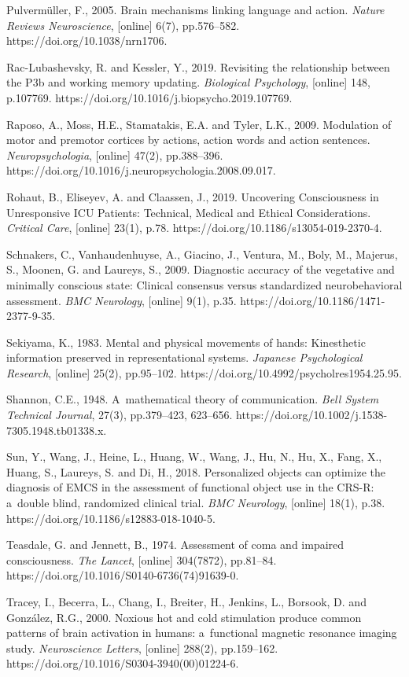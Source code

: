 Pulvermüller, F., 2005. Brain mechanisms linking language and action. \textit{Nature Reviews Neuroscience}, [online] 6(7), pp.576–582. https://doi.org/10.1038/nrn1706.

Rac-Lubashevsky, R. and Kessler, Y., 2019. Revisiting the relationship between the P3b and working memory updating. \textit{Biological Psychology}, [online] 148, p.107769. https://doi.org/10.1016/j.biopsycho.2019.107769.

Raposo, A., Moss, H.E., Stamatakis, E.A. and Tyler, L.K., 2009. Modulation of motor and premotor cortices by actions, action words and action sentences. \textit{Neuropsychologia}, [online] 47(2), pp.388–396. https://doi.org/10.1016/j.neuropsychologia.2008.09.017.

Rohaut, B., Eliseyev, A. and Claassen, J., 2019. Uncovering Consciousness in Unresponsive ICU Patients: Technical, Medical and Ethical Considerations. \textit{Critical Care}, [online] 23(1), p.78. https://doi.org/10.1186/s13054-019-2370-4.

Schnakers, C., Vanhaudenhuyse, A., Giacino, J., Ventura, M., Boly, M., Majerus, S., Moonen, G. and Laureys, S., 2009. Diagnostic accuracy of the vegetative and minimally conscious state: Clinical consensus versus standardized neurobehavioral assessment. \textit{BMC Neurology}, [online] 9(1), p.35. https://doi.org/10.1186/1471-2377-9-35.

Sekiyama, K., 1983. Mental and physical movements of hands: Kinesthetic information preserved in representational systems. \textit{Japanese Psychological Research}, [online] 25(2), pp.95–102. https://doi.org/10.4992/psycholres1954.25.95.

Shannon, C.E., 1948. A~mathematical theory of communication. \textit{Bell System Technical Journal}, 27(3), pp.379–423, 623–656. https://doi.org/10.1002/j.1538-7305.1948.tb01338.x.

Sun, Y., Wang, J., Heine, L., Huang, W., Wang, J., Hu, N., Hu, X., Fang, X., Huang, S., Laureys, S. and Di, H., 2018. Personalized objects can optimize the diagnosis of EMCS in the assessment of functional object use in the CRS-R: a~double blind, randomized clinical trial. \textit{BMC Neurology}, [online] 18(1), p.38. https://doi.org/10.1186/s12883-018-1040-5.

Teasdale, G. and Jennett, B., 1974. Assessment of coma and impaired consciousness. \textit{The Lancet}, [online] 304(7872), pp.81–84. https://doi.org/10.1016/S0140-6736(74)91639-0.

Tracey, I., Becerra, L., Chang, I., Breiter, H., Jenkins, L., Borsook, D. and González, R.G., 2000. Noxious hot and cold stimulation produce common patterns of brain activation in humans: a~functional magnetic resonance imaging study. \textit{Neuroscience Letters}, [online] 288(2), pp.159–162. https://doi.org/10.1016/S0304-3940(00)01224-6.

